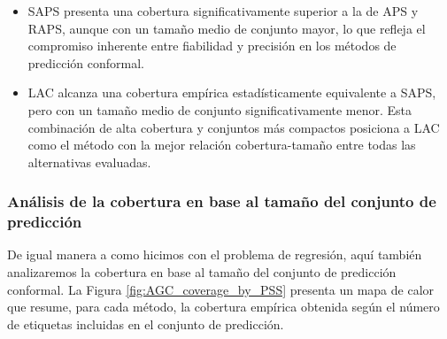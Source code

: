 \begin{itemize}
    
    \item \acrshort{SAPS} presenta una cobertura significativamente superior a la de \acrshort{APS} y \acrshort{RAPS}, aunque con un tamaño medio de conjunto mayor, lo que refleja el compromiso inherente entre fiabilidad y precisión en los métodos de predicción conformal.
    
    \item \acrshort{LAC} alcanza una cobertura empírica estadísticamente equivalente a \acrshort{SAPS}, pero con un tamaño medio de conjunto significativamente menor. Esta combinación de alta cobertura y conjuntos más compactos posiciona a \acrshort{LAC} como el método con la mejor relación cobertura-tamaño entre todas las alternativas evaluadas.
    
\end{itemize}

\FloatBarrier


\subsubsection{Análisis de la cobertura en base al tamaño del conjunto de predicción}

De igual manera a como hicimos con el problema de regresión, aquí también analizaremos la cobertura en base al tamaño del conjunto de predicción conformal. 
La Figura \ref{fig:AGC_coverage_by_PSS} presenta un mapa de calor que resume, para cada método, la cobertura empírica obtenida según el número de etiquetas incluidas en el conjunto de predicción.


